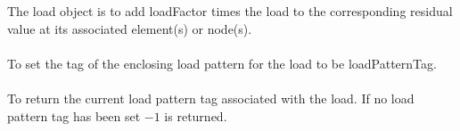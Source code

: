   \\
 \\
The load object is to add \p loadFactor times the load to the
corresponding residual value at its associated element(s) or node(s). \\

\\
To set the tag of the enclosing load pattern for the load to be 
\p loadPatternTag. \\

\\
To return the current load pattern tag associated with the load. If no
load pattern tag has been set $-1$ is returned.

